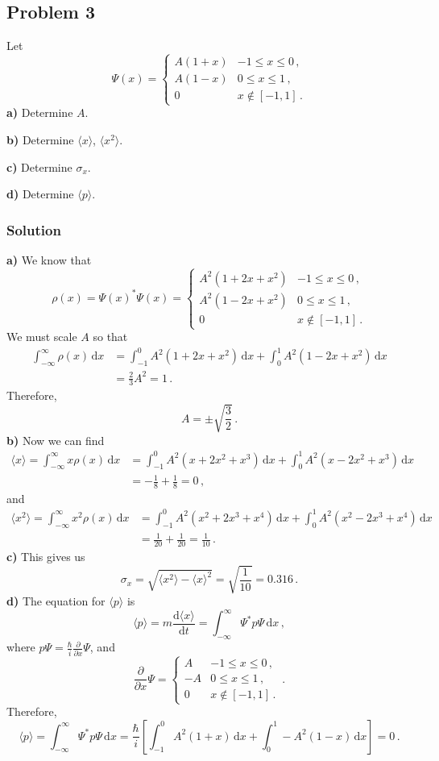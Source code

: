\documentclass[letterpaper,10pt]{article}
\def\d{\mathrm{d}}
\begin{document}
\subsection*{Problem 3}
Let
\begin{equation*}
\Psi(x)= 
\begin{cases}
A(1+x) & -1\leq x\leq 0\,,\\
A(1-x) & 0\leq x\leq 1\,,\\
0      & x\notin [-1,1]\,.
\end{cases}
\end{equation*}
\textbf{a)} Determine $A$.

\textbf{b)} Determine $\langle x\rangle$, $\langle x^2\rangle$.

\textbf{c)} Determine $\sigma_x$.

\textbf{d)} Determine $\langle p\rangle$.

\subsubsection*{Solution}
\textbf{a)} We know that
\[
\rho(x)=\Psi(x)^*\Psi(x)=
\begin{cases}
A^2(1+2x+x^2) & -1\leq x\leq 0\,,\\
A^2(1-2x+x^2) & 0\leq x\leq 1\,,\\
0      & x\notin [-1,1]\,.
\end{cases}
\]
We must scale $A$ so that
\begin{align*}
\int_{-\infty}^\infty\rho(x)\,\d x
&=\int_{-1}^0 A^2(1+2x+x^2)\,\d x+\int_0^1 A^2(1-2x+x^2)\,\d x\\
&=\frac{2}{3}A^2=1\,.
\end{align*}
Therefore,
\[
A=\pm\sqrt{\frac{3}{2}}\,.
\]
\textbf{b)} Now we can find
\begin{align*}
\langle x\rangle
=\int_{-\infty}^\infty x\rho(x)\,\d x
&=\int_{-1}^0 A^2(x+2x^2+x^3)\,\d x+\int_0^1 A^2(x-2x^2+x^3)\,\d x\\
&=-\frac{1}{8}+\frac{1}{8}=0\,,
\end{align*}
and
\begin{align*}
\langle x^2\rangle
=\int_{-\infty}^\infty x^2\rho(x)\,\d x
&=\int_{-1}^0 A^2(x^2+2x^3+x^4)\,\d x+\int_0^1 A^2(x^2-2x^3+x^4)\,\d x\\
&=\frac{1}{20}+\frac{1}{20}=\frac{1}{10}\,.
\end{align*}
\textbf{c)} This gives us
\[
\sigma_x=\sqrt{\langle x^2\rangle-\langle
x\rangle^2}=\sqrt{\frac{1}{10}}=0.316\,.
\]
\textbf{d)} The equation for $\langle p\rangle$ is
\[
\langle p\rangle=m\frac{\d\langle x\rangle}{\d t}
=\int_{-\infty}^\infty\Psi^*p\Psi\,\d x\,,
\]
where $p\Psi=\frac{\hbar}{i}\frac{\partial}{\partial x}\Psi$, and
\[
\frac{\partial}{\partial x}\Psi=
\begin{cases}
A & -1\leq x\leq 0\,,\\
-A & 0\leq x\leq 1\,,\\
0      & x\notin [-1,1]\,.
\end{cases}\,.
\]
Therefore,
\[
\langle p\rangle=\int_{-\infty}^\infty\Psi^*p\Psi\,\d x
=\frac{\hbar}{i}\left[\int_{-1}^0 A^2(1+x)\,\d x
+\int_0^1 -A^2(1-x)\,\d x\right]=0\,.
\]
\end{document}
